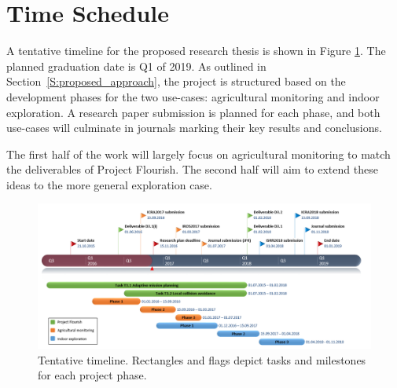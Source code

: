 \section{Time Schedule}
\label{S:time_schedule}


A tentative timeline for the proposed research thesis is shown in Figure \ref{F:gantt_chart}. The planned 
graduation date is Q1 of 2019. As outlined in Section~\ref{S:proposed_approach}, the project is structured 
based on the development phases for the two use-cases: agricultural monitoring and indoor exploration. A 
research paper submission is planned for each phase, and both use-cases will culminate in journals 
marking their key results and conclusions.

The first half of the work will largely focus on agricultural monitoring to match the deliverables of Project 
Flourish. The second half will aim to extend these ideas to the more general exploration case.

\begin{landscape}

\begin{figure}[h!]
\centering
  \includegraphics[width=\linewidth]{images/gantt.png}
   \caption{Tentative timeline. Rectangles and flags depict tasks and milestones for each project 
phase.}
    \label{F:gantt_chart}
\end{figure}

\end{landscape}